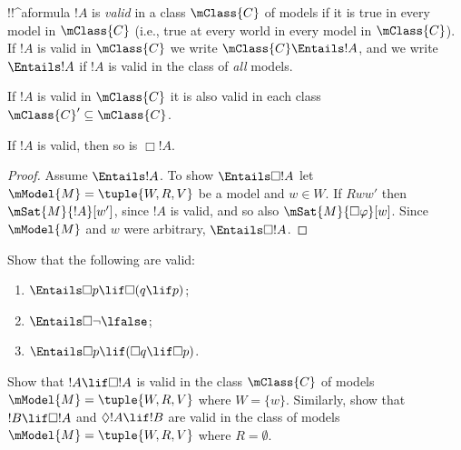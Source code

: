 \documentclass[../../../include/open-logic-section]{subfiles}
\begin{document}


\begin{defn}
  !!^a{formula} $!A$ is \emph{valid} in a class $\mClass{C}$ of
  models if it is true in every model in $\mClass{C}$ (i.e., true at
  every world in every model in $\mClass{C}$). If $!A$ is valid
  in $\mClass{C}$ we write $\mClass{C} \Entails !A$, and we
  write $\Entails !A$ if $!A$ is valid in the class of
  \emph{all} models.
\end{defn}

\begin{prop}
  If $!A$ is valid in $\mClass{C}$ it is also valid in each class
  $\mClass{C}' \subseteq \mClass{C}$.
\end{prop}

\begin{prop}
  If $!A$ is valid, then so is $\Box!A$. 
\end{prop}

\begin{proof}
  Assume $\Entails !A$. To show $\Entails \Box!A$ let $\mModel{M} =
  \tuple{W, R, V}$ be a model and $w \in W$. If $Rww'$ then
  $\mSat{M}{!A}[w']$, since $!A$ is valid, and so also
  $\mSat{M}{\Box\varphi}[w]$. Since $\mModel{M}$ and $w$ were
  arbitrary, $\Entails \Box!A$.
\end{proof}

\begin{prob}
  Show that the following are valid:
  \begin{enumerate}
  \item $\Entails \Box p \lif \Box (q \lif p)$;
  \item $\Entails \Box \lnot \lfalse$;
  \item $\Entails \Box p \lif (\Box q \lif \Box p)$.
  \end{enumerate}
\end{prob}

\begin{prob}
  Show that $!A \lif \Box!A$ is valid in the class $\mClass{C}$ of
  models $\mModel{M} = \tuple{W, R, V}$ where $W = \{w\}$. Similarly,
  show that $!B \lif \Box !A$ and $\Diamond !A \lif !B$ are valid in
  the class of models $\mModel{M} = \tuple{W, R, V}$ where
  $R = \emptyset$.
\end{prob}
\end{document}
